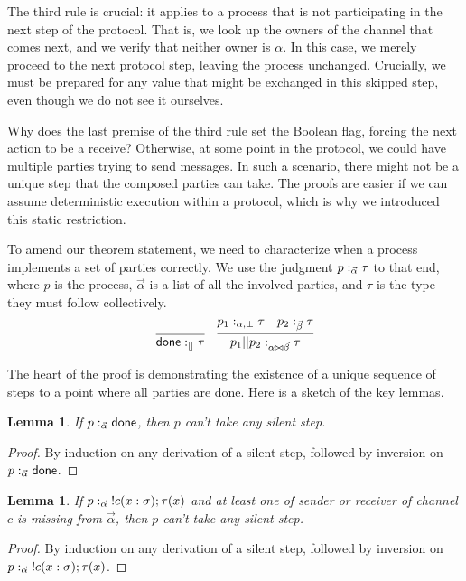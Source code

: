 \documentclass{amsbook}
\newtheorem{lemma}[theorem]{Lemma}
\theoremstyle{definition}
\theoremstyle{remark}
\numberwithin{section}{chapter}
\numberwithin{equation}{chapter}
\begin{document}
The third rule is crucial: it applies to a process that is not participating in the next step of the protocol.
That is, we look up the owners of the channel that comes next, and we verify that neither owner is $\alpha$.
In this case, we merely proceed to the next protocol step, leaving the process unchanged.
Crucially, we must be prepared for any value that might be exchanged in this skipped step, even though we do not see it ourselves.

Why does the last premise of the third rule set the Boolean flag, forcing the next action to be a receive?
Otherwise, at some point in the protocol, we could have multiple parties trying to send messages.
In such a scenario, there might not be a unique step that the composed parties can take.
The proofs are easier if we can assume deterministic execution within a protocol, which is why we introduced this static restriction.

To amend our theorem statement, we need to characterize when a process implements a set of parties correctly.
We use the judgment $p :_{\vec{\alpha}} \tau$ to that end, where $p$ is the process, $\vec{\alpha}$ is a list of all the involved parties, and $\tau$ is the type they must follow collectively.
$$\infer{\mptys{\done}{[]}{\tau}}{}
\quad \infer{\mptys{\parl{p_1}{p_2}}{\concat{\alpha}{\vec{\beta}}}{\tau}}{
  \mpty{p_1}{\alpha}{\bot}{\tau}
  & \mptys{p_2}{\vec{\beta}}{\tau}
}$$

The heart of the proof is demonstrating the existence of a unique sequence of steps to a point where all parties are done.
Here is a sketch of the key lemmas.

\begin{lemma}\label{forever_done}
  If $p :_{\vec{\alpha}} \mathsf{done}$, then $p$ can't take any silent step.
\end{lemma}
\begin{proof}
  By induction on any derivation of a silent step, followed by inversion on $p :_{\vec{\alpha}} \mathsf{done}$.
\end{proof}

\begin{lemma}\label{comm_stuck}
  If $p :_{\vec{\alpha}} \; !c(x : \sigma); \tau(x)$ and at least one of sender or receiver of channel $c$ is missing from $\vec{\alpha}$, then $p$ can't take any silent step.
\end{lemma}
\begin{proof}
  By induction on any derivation of a silent step, followed by inversion on $p :_{\vec{\alpha}} \; !c(x : \sigma); \tau(x)$.
\end{proof}
\end{document}
